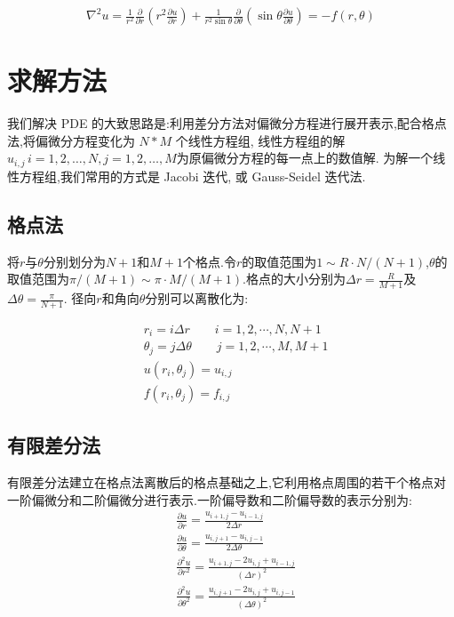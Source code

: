 \begin{align}
\nabla ^ { 2 } u = \frac { 1 } { r ^ { 2 } } \frac { \partial } { \partial r } \left( r ^ { 2 } \frac { \partial u } { \partial r } \right) + \frac { 1 } { r ^ { 2 } \sin \theta } \frac { \partial } { \partial \theta } \left( \sin \theta \frac { \partial u } { \partial \theta } \right)= -f ( r , \theta )
\end{align}

\section{求解方法}

我们解决 PDE 的大致思路是:利用差分方法对偏微分方程进行展开表示,配合格点法,将偏微分方程变化为 $N*M$ 个线性方程组, 线性方程组的解$u_{i,j}\,i = 1,2,\ldots, N, j=1,2,\ldots, M$为原偏微分方程的每一点上的数值解. 为解一个线性方程组,我们常用的方式是 Jacobi 迭代, 或 Gauss-Seidel 迭代法.

\subsection{格点法}

将$r$与$\theta$分别划分为$N+1$和$M+1$个格点.令$r$的取值范围为$1\sim R\cdot N/(N+1)$,$\theta$的取值范围为$\pi/(M+1)\sim \pi\cdot M/(M+1)$.格点的大小分别为$\Delta r=\frac {R} {M+1}$及$\Delta \theta=\frac {\pi} {N+1}$. 径向$r$和角向$\theta$分别可以离散化为:

\begin{align}
&r_i=i\Delta r\quad\quad i=1,2,\cdots,N,N+1\\
&\theta_j=j\Delta \theta\quad\quad j=1,2,\cdots,M,M+1\\
&u(r_i,\theta_j)=u_{i,j}\\
&f(r_i,\theta_j)=f_{i,j}
\end{align}

\subsection{有限差分法}

有限差分法建立在格点法离散后的格点基础之上,它利用格点周围的若干个格点对一阶偏微分和二阶偏微分进行表示.一阶偏导数和二阶偏导数的表示分别为:
\begin{align}
& \frac { \partial u } { \partial r } = \frac { u _ { i + 1,j } - u _ { i -1 , j} } {2\Delta r}\\
& \frac { \partial u } { \partial \theta }  = \frac { u _ { i, j + 1 } - u _ {i,  j -1} } {2\Delta \theta}\\
& \frac { \partial ^ { 2 } u } { \partial r ^ { 2 } }  =  \frac { u _ { i + 1, j } - 2 u _ { i, j } + u _ { i - 1, j} }  { (\Delta r)^2}\\
&\frac { \partial ^ { 2 } u } { \partial \theta ^ { 2 } } =  \frac { u _ {i, j + 1 } - 2 u _ {i, j } + u _ {i, j - 1} }  { (\Delta \theta)^2}
\end{align}

